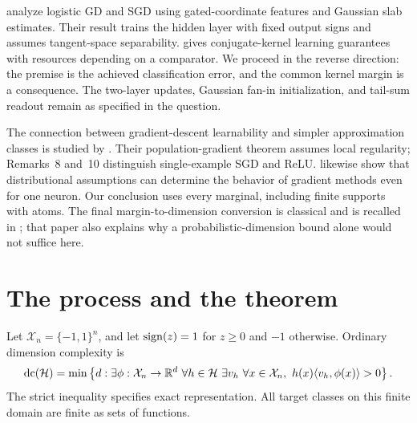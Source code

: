 \documentclass[11pt,letterpaper,pmlr,twoside]{jmlr}
\newcommand{\R}{\mathbb R}\newcommand{\E}{\mathbb E}
\newcommand{\X}{\mathcal X}\newcommand{\Hc}{\mathcal H}
\newcommand{\ip}[2]{\langle #1,#2\rangle}\newcommand{\norm}[1]{\lVert #1\rVert}
\begin{document}
\citet{JiT20} analyze logistic GD and SGD using gated-coordinate features and Gaussian slab estimates. Their result trains the hidden layer with fixed output signs and assumes tangent-space separability. \citet{Daniely17} gives conjugate-kernel learning guarantees with resources depending on a comparator. We proceed in the reverse direction: the premise is the achieved classification error, and the common kernel margin is a consequence. The two-layer updates, Gaussian fan-in initialization, and tail-sum readout remain as specified in the question.

The connection between gradient-descent learnability and simpler approximation classes is studied by \citet{Malach21}. Their population-gradient theorem assumes local regularity; Remarks~8 and~10 distinguish single-example SGD and ReLU. \citet{Yehudai20} likewise show that distributional assumptions can determine the behavior of gradient methods even for one neuron. Our conclusion uses every marginal, including finite supports with atoms. The final margin-to-dimension conversion is classical and is recalled in \citet[Section~2.3]{KMS20}; that paper also explains why a probabilistic-dimension bound alone would not suffice here.

\section{The process and the theorem}
Let $\X_n=\{-1,1\}^n$, and let $\operatorname{sign}(z)=1$ for $z\ge0$ and $-1$ otherwise. Ordinary dimension complexity is
\begin{equation}
 \dc(\Hc)=\min\left\{d:\exists\phi:\X_n\to\R^d\ 
 \forall h\in\Hc\ \exists v_h\ \forall x\in\X_n,
 \ h(x)\ip{v_h}{\phi(x)}>0\right\}.
 \label{eq:dc}
\end{equation}
The strict inequality specifies exact representation. All target classes on this finite domain are finite as sets of functions.
\end{document}
